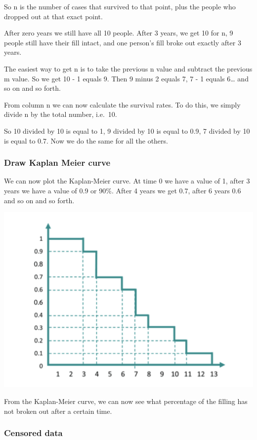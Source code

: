 \documentclass[
]{book}
\begin{document}
So n is the number of cases that survived to that point, plus the people who dropped out at that exact point.

After zero years we still have all 10 people. After 3 years, we get 10 for n, 9 people still have their fill intact, and one person's fill broke out exactly after 3 years.

The easiest way to get n is to take the previous n value and subtract the previous m value. So we get 10 - 1 equals 9. Then 9 minus 2 equals 7, 7 - 1 equals 6\ldots{} and so on and so forth.

From column n we can now calculate the survival rates. To do this, we simply divide n by the total number, i.e.~10.

So 10 divided by 10 is equal to 1, 9 divided by 10 is equal to 0.9, 7 divided by 10 is equal to 0.7. Now we do the same for all the others.

\hypertarget{draw-kaplan-meier-curve}{%
\subsubsection{Draw Kaplan Meier curve}\label{draw-kaplan-meier-curve}}

We can now plot the Kaplan-Meier curve. At time 0 we have a value of 1, after 3 years we have a value of 0.9 or 90\%. After 4 years we get 0.7, after 6 years 0.6 and so on and so forth.

\includegraphics{figs/km1.png}

From the Kaplan-Meier curve, we can now see what percentage of the filling has not broken out after a certain time.

\hypertarget{censored-data}{%
\subsubsection{Censored data}\label{censored-data}}
\end{document}
